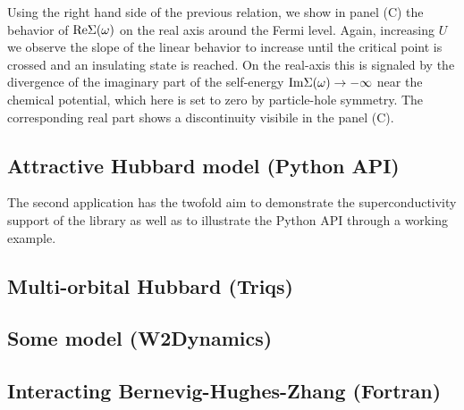 Using the right hand side of the previous relation, we show in
panel (C) the behavior of  ${\rm Re}\Sigma(\omega)$
on the real axis around the Fermi level. Again, increasing $U$
we observe the slope of the linear behavior to increase until the
critical point is crossed and an insulating state is reached. On the
real-axis this is signaled by the divergence of the imaginary part of
the self-energy   ${\rm Im}\Sigma(\omega) \rightarrow -\infty$
near the chemical potential, which here is set to zero by
particle-hole symmetry. The corresponding real part shows a
discontinuity visibile in the panel (C). 


\subsection{Attractive Hubbard model (Python API)}
The second application has the twofold aim to demonstrate the
superconductivity support of the \NAME library as well as to
illustrate the Python API through a working example.



\subsection{Multi-orbital Hubbard (Triqs)}

\subsection{Some model (W2Dynamics)}

\subsection{Interacting Bernevig-Hughes-Zhang (Fortran)}

